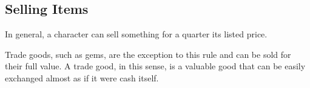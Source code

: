     \subsection{Selling Items}
        In general, a character can sell something for a quarter its listed price.

        Trade goods, such as gems, are the exception to this rule and can be sold for their full value.
        A trade good, in this sense, is a valuable good that can be easily exchanged almost as if it were cash itself.
